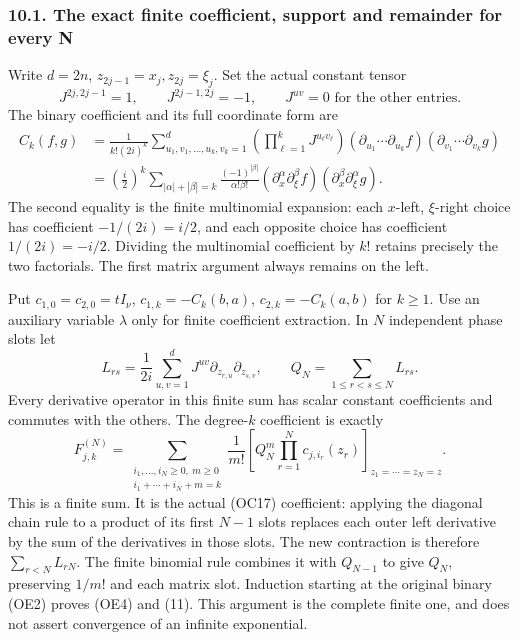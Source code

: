 \documentclass[
  11pt,
]{article}
\begin{document}
\subsubsection{10.1. The exact finite coefficient, support and remainder
for every
N}\label{the-exact-finite-coefficient-support-and-remainder-for-every-n}

Write \(d=2n\), \(z_{2j-1}=x_j,z_{2j}=\xi_j\). Set the actual constant
tensor \[
J^{2j,2j-1}=1,\qquad J^{2j-1,2j}=-1,
\qquad J^{uv}=0\text{ for the other entries}.
\tag{OE1}
\] The binary coefficient and its full coordinate form are \[
\begin{split}
C_k(f,g)
&=\frac1{k!(2i)^k}
  \sum_{u_1,v_1,\ldots,u_k,v_k=1}^{d}
  \left(\prod_{\ell=1}^kJ^{u_\ell v_\ell}\right)
  (\partial_{u_1}\cdots\partial_{u_k}f)
  (\partial_{v_1}\cdots\partial_{v_k}g)\\
&=\left(\frac i2\right)^k
  \sum_{|\alpha|+|\beta|=k}
    \frac{(-1)^{|\beta|}}{\alpha!\beta!}
       (\partial_x^\alpha\partial_\xi^\beta f)
       (\partial_x^\beta\partial_\xi^\alpha g).
\end{split}
\tag{OE2}
\] The second equality is the finite multinomial expansion: each
\(x\)-left, \(\xi\)-right choice has coefficient \(-1/(2i)=i/2\), and
each opposite choice has coefficient \(1/(2i)=-i/2\). Dividing the
multinomial coefficient by \(k!\) retains precisely the two factorials.
The first matrix argument always remains on the left.

Put \(c_{1,0}=c_{2,0}=tI_\nu\), \(c_{1,k}=-C_k(b,a)\),
\(c_{2,k}=-C_k(a,b)\) for \(k\geq1\). Use an auxiliary variable
\(\lambda\) only for finite coefficient extraction. In \(N\) independent
phase slots let \[
L_{rs}=\frac1{2i}\sum_{u,v=1}^{d}
                 J^{uv}\partial_{z_{r,u}}\partial_{z_{s,v}},
\qquad
Q_N=\sum_{1\leq r<s\leq N}L_{rs}.
\tag{OE3}
\] Every derivative operator in this finite sum has scalar constant
coefficients and commutes with the others. The degree-\(k\) coefficient
is exactly \[
F_{j,k}^{(N)}
 =\sum_{\substack{i_1,\ldots,i_N\geq0,\ m\geq0\\
                         i_1+\cdots+i_N+m=k}}
     \frac1{m!}
       \left[Q_N^m\prod_{r=1}^{N}c_{j,i_r}(z_r)
                               \right]_{z_1=\cdots=z_N=z}.
\tag{OE4}
\] This is a finite sum. It is the actual (OC17) coefficient: applying
the diagonal chain rule to a product of its first \(N-1\) slots replaces
each outer left derivative by the sum of the derivatives in those slots.
The new contraction is therefore \(\sum_{r<N}L_{rN}\). The finite
binomial rule combines it with \(Q_{N-1}\) to give \(Q_N\), preserving
\(1/m!\) and each matrix slot. Induction starting at the original binary
(OE2) proves (OE4) and (11). This argument is the complete finite one,
and does not assert convergence of an infinite exponential.
\end{document}
